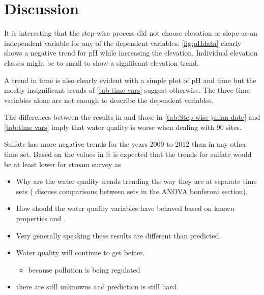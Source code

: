 
\section{Discussion}

It is interesting that the step-wise process did not choose elevation or slope as an independent variable for any of the dependent variables.  \autoref{fig:pHdata} clearly shows a negative trend for pH while increasing the elevation.  Individual elevation classes might be to small to show a significant elevation trend.

A trend in time is also clearly evident with a simple plot of pH and time but the mostly insignificant trends of \autoref{tab:time vars} suggest otherwise.  The three time variables alone are not enough to describe the dependent variables.

 The differences between the results in \citet{robinson2008ph} and those in \autoref{tab:Step-wise julian date} and \autoref{tab:time vars} imply that water quality is worse when dealing with 90 sites.%

Sulfate has more negative trends for the years 2009 to 2012 than in any other time set. Based on the values in  it is expected that the trends for sulfate would be at least lower for stream survey as
\begin{itemize}
	\item Why are the water quality trends trending the way they are at separate time sets ( discuss comparisons between sets in the ANOVA bonferoni section).
	\item How should the water quality variables have behaved based on known properties and \citep{robinson2008ph}.%
	\item Very generally speaking these results are different than \citep{robinson2008ph} predicted.%
	\item Water quality will continue to get better. %
	\begin{itemize}
		\item because pollution is being regulated
	\end{itemize}
	\item there are still unknowns and prediction is still hard.
\end{itemize}
	
